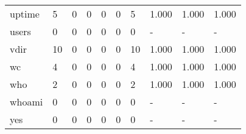\begin{longtable}{lp{2.0cm}p{2.0cm}p{2.0cm}p{2.0cm}p{2.0cm}p{2.0cm}p{2.0cm}p{2.0cm}p{2.0cm}}
uptime    &                      5 &                                  0 &                                 0 &                                0 &                                 0 &                               5 &                                1.000 &                                  1.000 &                                1.000 \\
users     &                      0 &                                  0 &                                 0 &                                0 &                                 0 &                               0 &                                    - &                                      - &                                    - \\
vdir      &                     10 &                                  0 &                                 0 &                                0 &                                 0 &                              10 &                                1.000 &                                  1.000 &                                1.000 \\
wc        &                      4 &                                  0 &                                 0 &                                0 &                                 0 &                               4 &                                1.000 &                                  1.000 &                                1.000 \\
who       &                      2 &                                  0 &                                 0 &                                0 &                                 0 &                               2 &                                1.000 &                                  1.000 &                                1.000 \\
whoami    &                      0 &                                  0 &                                 0 &                                0 &                                 0 &                               0 &                                    - &                                      - &                                    - \\
yes       &                      0 &                                  0 &                                 0 &                                0 &                                 0 &                               0 &                                    - &                                      - &                                    - \\
\end{longtable}
